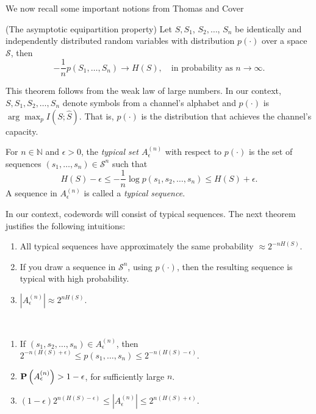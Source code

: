 We now recall some important notions from Thomas and Cover~\cite{infotheory}

\begin{theorem}{(The asymptotic equipartition property)} Let $S, S_1$, $S_2, \ldots$, $S_n$ be identically and independently distributed random variables with distribution $p(\cdot)$ over a space $\mathcal{S}$, then
%
$$-\frac{1}{n} p(S_1, \ldots, S_n) \to H(S), \quad \text{in probability as } n \to \infty.$$
%
\end{theorem}

This theorem follows from the weak law of large numbers. In our context, $S, S_1, S_2, \ldots, S_n$ denote symbols from a channel's alphabet and $p(\cdot)$ is $\arg\max_p I(S; \hat{S})$. That is, $p(\cdot)$ is the distribution that achieves the channel's capacity.

\begin{definition}
For $n \in \mathbb{N}$ and $\epsilon > 0$, the \emph{typical set $A^{(n)}_\epsilon$} with respect to $p(\cdot)$ is the set of sequences $(s_1, \dots, s_n) \in \mathcal{S}^n$ such that
%
$$H(S) - \epsilon \leq -\frac{1}{n}\log p(s_1, s_2, \ldots, s_n) \leq H(S) + \epsilon.$$
%
A sequence in $A^{(n)}_\epsilon$ is called a \emph{typical sequence}.
\end{definition}

In our context, codewords will consist of typical sequences.
The next theorem justifies the following intuitions:

\begin{enumerate}
\item All typical sequences have approximately the same probability $\approx 2^{-nH(S)}$.
\item If you draw a sequence in $\mathcal{S}^n$, using $p(\cdot)$, then the resulting sequence is typical with high probability.
\item $\left|A^{(n)}_\epsilon\right| \approx 2^{nH(S)}$.
\end{enumerate}

\begin{theorem}\mbox{   }
\begin{enumerate}
\item If $\left(s_1, s_2, \ldots, s_n\right) \in A^{(n)}_\epsilon$, then $2^{-n\left(H(S) + \epsilon\right)} \leq p(s_1, \ldots, s_n) \leq 2^{-n\left(H(S) - \epsilon\right)}.$
\item $\mathbf{P}\left(A^{(n)}_\epsilon\right) > 1 - \epsilon$, for sufficiently large $n$.
\item $(1 - \epsilon)2^{n\left(H(S) - \epsilon\right)} \leq \left|A^{(n)}_\epsilon\right| \leq 2^{n\left(H(S) + \epsilon\right)}$.
\end{enumerate}
\end{theorem}

